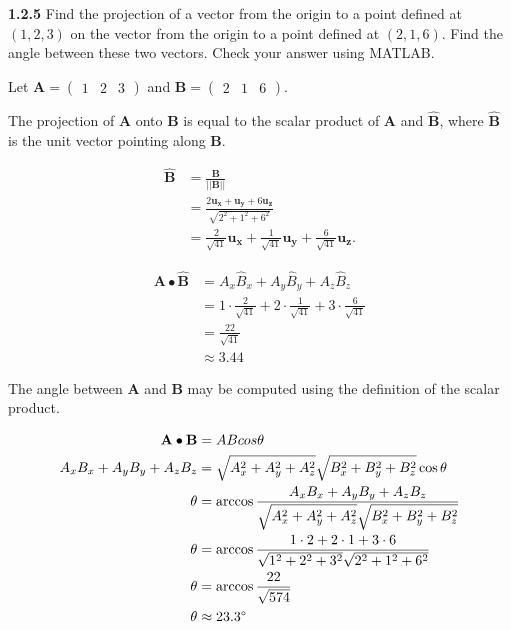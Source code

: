 \documentclass{article}
\begin{document}
\textbf{1.2.5} Find the projection of a vector from the origin to a point defined at $(1,2,3)$ on the vector from the
origin to a point defined at $(2,1,6)$. Find the angle between these two vectors. Check your answer using MATLAB.\@

\vspace{24pt}

Let $\mathbf{A} = \begin{pmatrix} 1 & 2 & 3 \end{pmatrix}$ and $\mathbf{B} = \begin{pmatrix} 2 & 1 & 6 \end{pmatrix}$.

The projection of $\mathbf{A}$ onto $\mathbf{B}$ is equal to the scalar product of $\mathbf{A}$ and $\mathbf{\hat{B}}$,
where $\mathbf{\hat{B}}$ is the unit vector pointing along $\mathbf{B}$.

\begin{equation*}
	\begin{split}
		\mathbf{\hat{B}} & = \frac{\mathbf{B}}{||\mathbf{B}||} \\
		& = \frac{2\mathbf{u_x} + \mathbf{u_y} + 6\mathbf{u_z}}{\sqrt{2^2 + 1^2 + 6^2}} \\
		& = \frac{2}{\sqrt{41}}\mathbf{u_x} + \frac{1}{\sqrt{41}}\mathbf{u_y} + \frac{6}{\sqrt{41}}\mathbf{u_z}.
	\end{split}
\end{equation*}

\begin{equation*}
	\begin{split}
		\mathbf{A} \bullet \mathbf{\hat{B}} & = A_x \hat{B}_x + A_y \hat{B}_y + A_z \hat{B}_z \\
		& = 1 \cdot \frac{2}{\sqrt{41}} + 2 \cdot \frac{1}{\sqrt{41}} + 3 \cdot \frac{6}{\sqrt{41}} \\
		& = \frac{22}{\sqrt{41}} \\
		& \approx 3.44
	\end{split}
\end{equation*}

The angle between $\mathbf{A}$ and $\mathbf{B}$ may be computed using the definition of the scalar product.

\begin{equation*}
	\begin{split}
		\mathbf{A} \bullet \mathbf{B} & = ABcos{\theta} \\
		A_x B_x + A_y B_y + A_z B_z & = \sqrt{A_x^2 + A_y^2 + A_z^2}\sqrt{B_x^2 + B_y^2 + B_z^2}\cos{\theta} \\
		\theta & = \arccos{\frac{A_x B_x + A_y B_y + A_z B_z}{\sqrt{A_x^2 + A_y^2 + A_z^2}\sqrt{B_x^2 + B_y^2 + B_z^2}}} \\
		\theta & = \arccos{\frac{1 \cdot 2 + 2 \cdot 1 + 3 \cdot 6}{\sqrt{1^2 + 2^2 + 3^2}\sqrt{2^2 + 1^2 + 6^2}}} \\
		\theta & = \arccos{\frac{22}{\sqrt{574}}} \\
		\theta & \approx 23.3 \degree
	\end{split}
\end{equation*}
\end{document}
